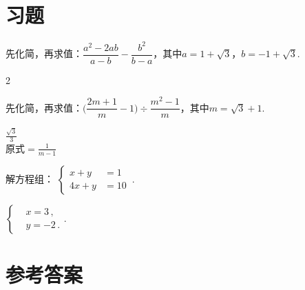   \section{习题}
    
    \begin{exercise}
      \item%
        先化简，再求值：$\dfrac{a^2-2ab}{a-b}-\dfrac{b^2}{b-a}$，其中$a=1+\sqrt3$，$b=-1+\sqrt3$.
          \begin{answer}
            2
          \end{answer}
      \vspace{4cm}
      \item%
        先化简，再求值：$\biggl(\dfrac{2m+1}{m}-1\biggr)\div\dfrac{m^2-1}m$，其中$m=\sqrt3+1$.
        \begin{answer}
          $\frac{\sqrt3}3$\\
          原式$=\frac1{m-1}$
        \end{answer}
      \vspace{4cm}\piec
      \item%
        解方程组：
          $\left\{\begin{aligned}
            x+y&=1\,\\
            4x+y&=10\,
          \end{aligned}\right.$.
        \begin{answer}
          $\left\{\begin{aligned}
            &x=3\,,\\
            &y=-2\,.
          \end{aligned}\right.$.
        \end{answer}
    \end{exercise}
\stopexercise

\newpage
\section{参考答案}
\begin{multicols}{2}
  \printanswer
\end{multicols}
